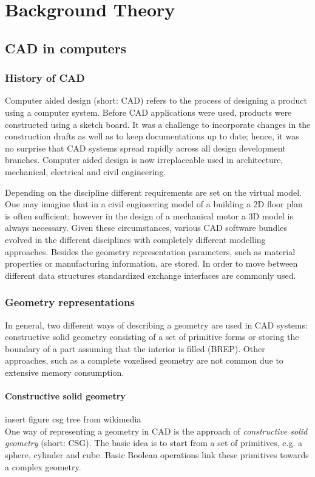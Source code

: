 \chapter{Background Theory}
\label{chapter:Background}

\section{CAD in computers}
\subsection{History of CAD}
Computer aided design (short: CAD) refers to the process of designing a product using a computer system. Before CAD applications were used, products were constructed using a sketch board. It was a challenge to incorporate changes in the construction drafts as well as to keep documentations up to date; hence, it was no surprise that CAD systems spread rapidly across all design development branches. Computer aided design is now irreplaceable used in architecture, mechanical, electrical and civil engineering.

Depending on the discipline different requirements are set on the virtual model. One may imagine that in a civil engineering model of a building a 2D floor plan is often sufficient; however in the design of a mechanical motor a 3D model is always necessary. Given these circumstances, various CAD software bundles evolved in the different disciplines with completely different modelling approaches. Besides the geometry representation parameters, such as material properties or manufacturing information, are stored. In order to move between different data structures standardized exchange interfaces are commonly used.
\subsection{Geometry representations}
In general, two different ways of describing a geometry are used in CAD systems: constructive solid geometry consisting of a set of primitive forms or storing the boundary of a part assuming that the interior is filled (BREP). Other approaches, such as a complete voxelised geometry are not common due to extensive memory consumption.
\subsubsection{Constructive solid geometry}
 insert figure csg tree from wikimedia \\
One way of representing a geometry in CAD is the approach of \emph{constructive solid geometry} (short: CSG). The basic idea is to start from a set of primitives, e.g. a sphere, cylinder and cube. Basic Boolean operations link these primitives towards a complex geometry. 

